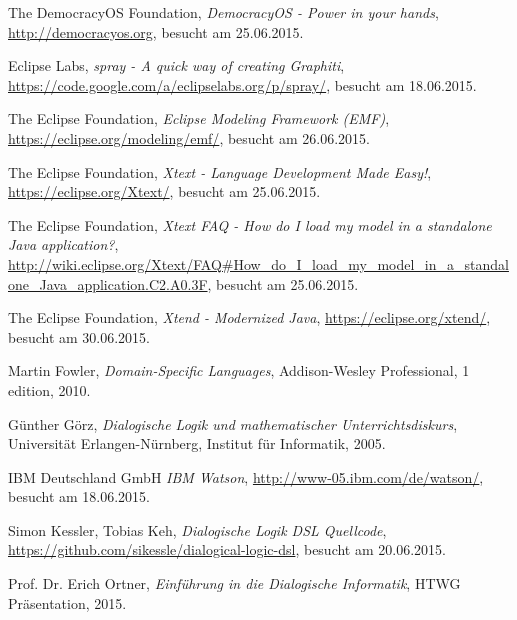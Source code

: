 \documentclass[11pt,a4paper,bibtotocnumbered]{scrreprt}
\begin{document}
\begin{singlespace}
\begin{thebibliography}{9}


  The DemocracyOS Foundation,
  \emph{DemocracyOS - Power in your hands},
  \url{http://democracyos.org},
  besucht am 25.06.2015.

  Eclipse Labs,
  \emph{spray - A quick way of creating Graphiti},
  \url{https://code.google.com/a/eclipselabs.org/p/spray/},
  besucht am 18.06.2015.

  The Eclipse Foundation,
  \emph{Eclipse Modeling Framework (EMF)},
  \url{https://eclipse.org/modeling/emf/},
  besucht am 26.06.2015.

  The Eclipse Foundation,
  \emph{Xtext - Language Development Made Easy!},
  \url{https://eclipse.org/Xtext/},
  besucht am 25.06.2015.
  
  The Eclipse Foundation,
  \emph{Xtext FAQ - How do I load my model in a standalone Java application?},
  \url{http://wiki.eclipse.org/Xtext/FAQ#How_do_I_load_my_model_in_a_standalone_Java_application.C2.A0.3F},
  besucht am 25.06.2015.

  The Eclipse Foundation,
  \emph{Xtend - Modernized Java},
  \url{https://eclipse.org/xtend/},
  besucht am 30.06.2015.

  Martin Fowler,
  \emph{Domain-Specific Languages},
  Addison-Wesley Professional,
  1 edition, 2010.

  G{\"u}nther G{\"o}rz,
  \emph{Dialogische Logik und mathematischer Unterrichtsdiskurs},
  Universit{\"a}t Erlangen-N{\"u}rnberg, Institut f{\"u}r Informatik,
  2005.
  
  IBM Deutschland GmbH
  \emph{IBM Watson},
  \url{http://www-05.ibm.com/de/watson/},
  besucht am 18.06.2015.
  
  Simon Kessler, Tobias Keh,
  \emph{Dialogische Logik DSL Quellcode},
  \url{https://github.com/sikessle/dialogical-logic-dsl},
  besucht am 20.06.2015.

  Prof. Dr. Erich Ortner,
  \emph{Einf{\"u}hrung in die Dialogische Informatik},
  HTWG Präsentation,
  2015.


\end{thebibliography}
\end{singlespace}
\end{document}

